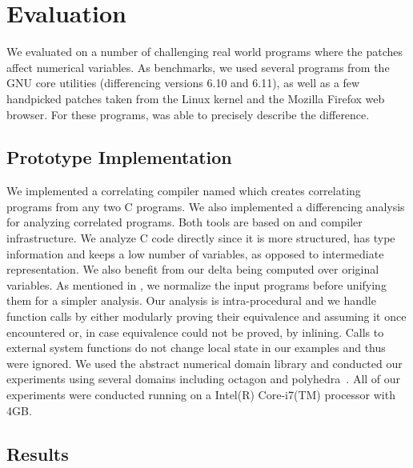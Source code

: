 \section{Evaluation}
We evaluated {\tool} on a number of challenging real world programs where the patches affect numerical variables. As benchmarks, we used several programs from the GNU core utilities (differencing versions 6.10 and 6.11), as well as a few handpicked patches taken from the Linux kernel and the Mozilla Firefox web browser. For these programs, {\tool} was able to precisely describe the difference.

\subsection{Prototype Implementation}
We implemented a correlating compiler named  which creates correlating programs from any two C programs. We also implemented a differencing analysis for analyzing correlated programs. Both tools are based on  and  compiler infrastructure. We analyze C code directly since it is more structured, has type information and keeps a low number of variables, as opposed to intermediate representation. We also benefit from our delta being computed over original variables. As mentioned in , we normalize the input programs before unifying them for a simpler analysis. Our analysis is intra-procedural and we handle function calls by either modularly proving their equivalence and assuming it once encountered or, in case equivalence could not be proved, by inlining. Calls to external system functions do not change local state in our examples and thus were ignored. We used the  abstract numerical domain library and conducted our experiments using several domains including octagon \cite{Mine2006} and polyhedra~\cite{CousotHalbwachs78}. All of our experiments were conducted running on a Intel(R) Core-i7(TM) processor with 4GB.

\subsection{Results}

%

